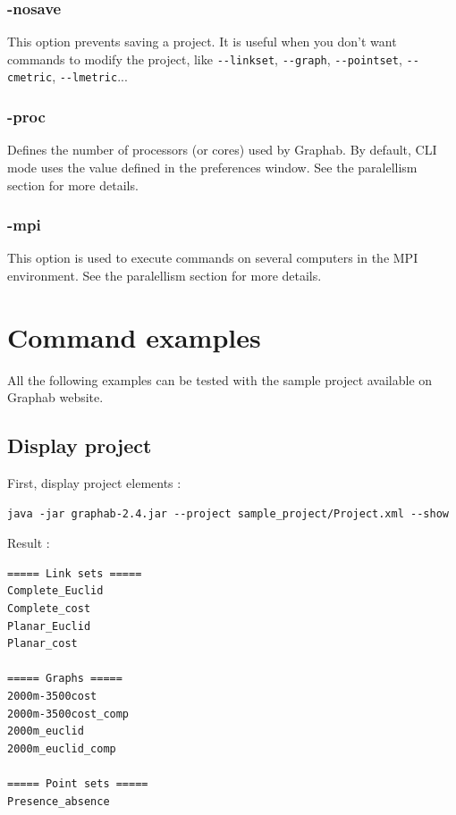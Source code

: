 \documentclass[a4paper,10pt]{report}
\begin{document}
\subsection{-nosave}
This option prevents saving a project. It is useful when you don't want commands to modify the project, 
like \verb|--linkset|, \verb|--graph|, \verb|--pointset|, \verb|--cmetric|, \verb|--lmetric|...

\subsection{-proc}
Defines the number of processors (or cores) used by Graphab.
By default, CLI mode uses the value defined in the preferences window.
See the paralellism section for more details.

\subsection{-mpi}
This option is used to execute commands on several computers in the MPI environment.
See the paralellism section for more details.

\chapter{Command examples}
All the following examples can be tested with the sample project available on Graphab website. 

\section{Display project}
First, display project elements :
\begin{Verbatim}
java -jar graphab-2.4.jar --project sample_project/Project.xml --show
\end{Verbatim}
Result :
\begin{Verbatim}
===== Link sets =====
Complete_Euclid
Complete_cost
Planar_Euclid
Planar_cost

===== Graphs =====
2000m-3500cost
2000m-3500cost_comp
2000m_euclid
2000m_euclid_comp

===== Point sets =====
Presence_absence
\end{Verbatim}
\end{document}
